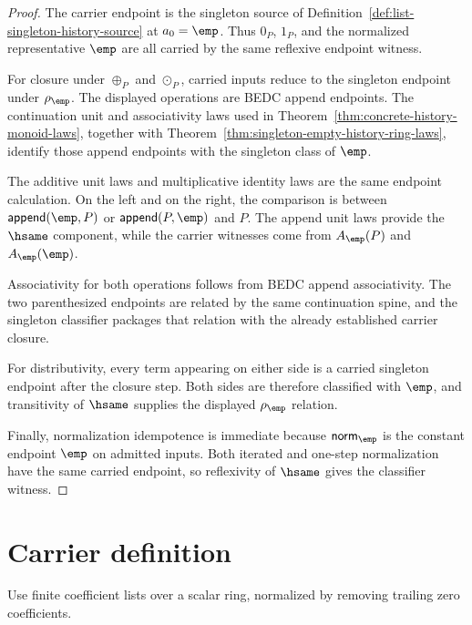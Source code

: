 \begin{proof}
The carrier endpoint is the singleton source of
Definition~\ref{def:list-singleton-history-source} at $a_0=\emp$. Thus
$0_P$, $1_P$, and the normalized representative $\emp$ are all carried by the
same reflexive endpoint witness.

For closure under $\oplus_P$ and $\odot_P$, carried inputs reduce to the
singleton endpoint under $\rho_{\emp}$. The displayed operations are BEDC
append endpoints. The continuation unit and associativity laws used in
Theorem~\ref{thm:concrete-history-monoid-laws}, together with
Theorem~\ref{thm:singleton-empty-history-ring-laws}, identify those append
endpoints with the singleton class of $\emp$.

The additive unit laws and multiplicative identity laws are the same endpoint
calculation. On the left and on the right, the comparison is between
$\mathsf{append}(\emp,P)$ or $\mathsf{append}(P,\emp)$ and $P$. The append unit
laws provide the $\hsame$ component, while the carrier witnesses come from
$A_{\emp}(P)$ and $A_{\emp}(\emp)$.

Associativity for both operations follows from BEDC append associativity.
The two parenthesized endpoints are related by the same continuation spine, and
the singleton classifier packages that relation with the already established
carrier closure.

For distributivity, every term appearing on either side is a carried singleton
endpoint after the closure step. Both sides are therefore classified with
$\emp$, and transitivity of $\hsame$ supplies the displayed
$\rho_{\emp}$ relation.

Finally, normalization idempotence is immediate because
$\mathsf{norm}_{\emp}$ is the constant endpoint $\emp$ on admitted inputs. Both
iterated and one-step normalization have the same carried endpoint, so
reflexivity of $\hsame$ gives the classifier witness.
\end{proof}

\section{Carrier definition}

\begin{definition}
\label{def:polynomial-carrier}
Use finite coefficient lists over a scalar ring, normalized by removing trailing zero coefficients.
\end{definition}

